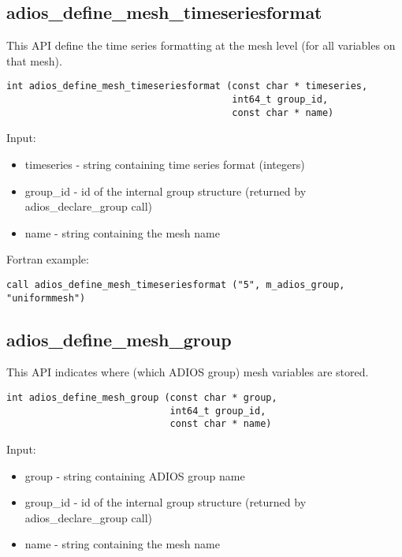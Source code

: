 \subsection{adios\_define\_mesh\_timeseriesformat}
This API define the time series formatting at the mesh level (for all variables on that mesh).

\begin{lstlisting}[alsolanguage=C,caption={},label={}]
int adios_define_mesh_timeseriesformat (const char * timeseries, 
                                        int64_t group_id, 
                                        const char * name)
\end{lstlisting}

Input:
\begin{itemize}
\item timeseries - string containing time series format (integers)
\item group\_id - id of the internal group structure (returned by adios\_declare\_group call)
\item name - string containing the mesh name
\end{itemize}

Fortran example:
\begin{lstlisting}[alsolanguage=Fortran,caption={},label={}]
call adios_define_mesh_timeseriesformat ("5", m_adios_group, "uniformmesh")
\end{lstlisting}


\subsection{adios\_define\_mesh\_group}
This API indicates where (which ADIOS group) mesh variables are stored.

\begin{lstlisting}[alsolanguage=C,caption={},label={}]
int adios_define_mesh_group (const char * group, 
                             int64_t group_id, 
                             const char * name)
\end{lstlisting}

Input:
\begin{itemize}
\item group - string containing ADIOS group name
\item group\_id - id of the internal group structure (returned by adios\_declare\_group call)
\item name - string containing the mesh name
\end{itemize}

